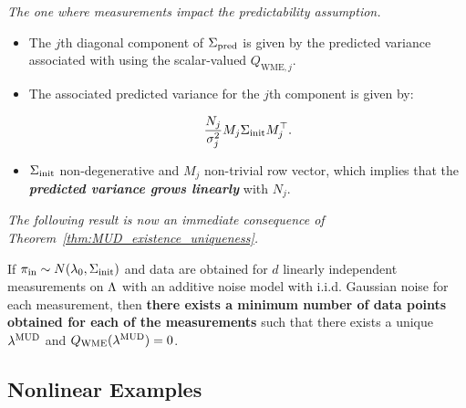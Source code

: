 \begin{frame}{\it The one where measurements impact the predictability assumption.}

\begin{itemize}

	\item The $j$th diagonal component of $\Sigma_\text{pred}$ is given by the predicted variance associated with using the scalar-valued $Q_{\text{WME},j}$.

	\bigskip
  \item The associated predicted variance for the $j$th component is given by:

	\bigskip
  \begin{equation}
  	\frac{N_j}{\sigma_j^2} M_j\Sigma_\text{init} M_j^\top.
  \end{equation}

  \bigskip
  \item $\Sigma_\text{init}$ non-degenerative and $M_j$ non-trivial row vector, which implies that the {\it \bf predicted variance grows linearly} with $N_j$.\\

\end{itemize}

\bigskip
\bigskip
\centering
{\it The following result is now an immediate consequence of Theorem~\ref{thm:MUD_existence_uniqueness}.}
\end{frame}

\begin{frame}

\begin{corollary}\label{cor:MUD_wme}
If $\operatorname*{\pi_{in}} \sim N(\lambda_0,\Sigma_\text{init})$ and data are obtained for $d$ linearly independent measurements on ${\Lambda}$ with an additive noise model with i.i.d. Gaussian noise for each measurement, then {\bf there exists a minimum number of data points obtained for each of the measurements} such that there exists a unique $\lambda^{\text{MUD}}$ and $Q_\text{WME}(\lambda^{\text{MUD}}) = 0$.
\end{corollary}

\end{frame}



\subsection{Nonlinear Examples}

